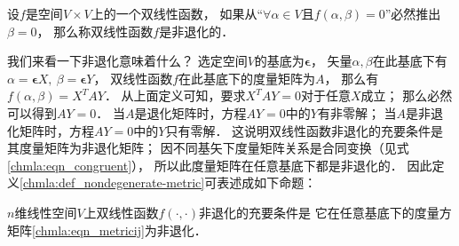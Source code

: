 \begin{definition}\label{chmla:def_nondegenerate-metric}
    设$f$是空间$V\times V$上的一个双线性函数，
    如果从“$\forall \alpha \in V \text{且} f(\alpha,\beta)=0$”必然推出$\beta =0$，
    那么称双线性函数$f$是{\heiti 非退化的}．
\end{definition}
我们来看一下非退化意味着什么？
选定空间$V$的基底为$\boldsymbol{\epsilon}$，
矢量$\alpha,\beta$在此基底下有
$\alpha= {\boldsymbol{\epsilon}} X,\ \beta= {\boldsymbol{\epsilon}} Y$，
双线性函数$f$在此基底下的度量矩阵为$A$，
那么有$f(\alpha,\beta)= X^T A Y$．
从上面定义可知，要求$X^T A Y=0$对于任意$X$成立；
那么必然可以得到$AY=0$．
当$A$是退化矩阵时，方程$AY=0$中的$Y$有非零解；
当$A$是非退化矩阵时，方程$AY=0$中的$Y$只有零解．
这说明双线性函数非退化的充要条件是其度量矩阵为非退化矩阵；
因不同基矢下度量矩阵关系是合同变换（见式\eqref{chmla:eqn_congruent}），
所以此度量矩阵在任意基底下都是非退化的．
因此定义\ref{chmla:def_nondegenerate-metric}可表述成如下命题：
\begin{proposition}\label{chmla:thm_nondegenerate-metric}
    $n$维线性空间$V$上双线性函数$f(\cdot,\cdot)$非退化的充要条件是
    它在任意基底下的度量方矩阵\eqref{chmla:eqn_metricij}为非退化．
\end{proposition}


